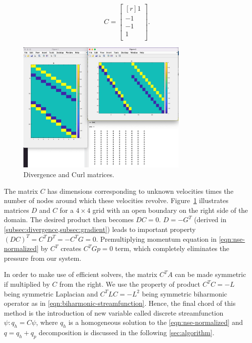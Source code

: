\documentclass{article}
\numberwithin{equation}{section}
\begin{document}
\begin{equation*}
  C = 
  \begin{bmatrix*}[r]
  1		\\
  -1	\\
  -1	\\
  1		\\
\end{bmatrix*}.
\end{equation*}

\begin{figure}[H]
\begin{center}
  \includegraphics[width=0.75\textwidth]{Figures/D-C-DC}
\end{center}
\caption{Divergence and Curl matrices.}
\label{fig:DC}
\end{figure}
The matrix $C$ has dimensions corresponding to unknown velocities times the number of nodes around which these velocities revolve. Figure~\ref{fig:DC} illustrates matrices $D$ and $C$ for a $4\times4$ grid with an open boundary on the right side of the domain. 
The desired product then becomes $DC=0$. $D=-G^T$ (derived in \cref{subsec:divergence,subsec:gradient}) leads to important property $(DC)^T=C^TD^T=-C^TG=0$. Premultiplying momentum equation in \cref{eqn:nse-normalized} by $C^T$ creates $C^TGp=0$ term, which completely eliminates the pressure from our system.

In order to make use of efficient solvers, the matrix $C^TA$ can be made symmetric if multiplied by $C$ from the right. We use the property of product $C^TC=-L$ being symmetric Laplacian and $C^TLC=-L^2$ being symmetric biharmonic operator as in \cref{eqn:biharmonic-streamfunction}. 
Hence, the final chord of this method is the introduction of new variable called discrete streamfunction $\psi:q_h=C\psi$, where $q_h$ is a homogeneous solution to the \cref{eqn:nse-normalized} and $q=q_h+q_p$ decomposition is discussed in the following \cref{sec:algorithm}.
\end{document}
